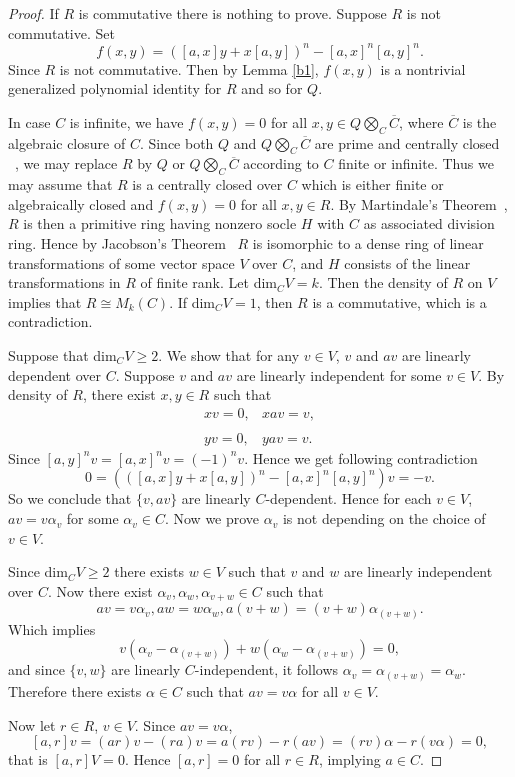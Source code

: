 \documentclass[12pt]{amsart}
\theoremstyle{definition}
\theoremstyle{remark}
\begin{document}
 \begin{proof}
 If $R$ is commutative there is nothing to prove.
 Suppose  $R$ is not commutative.
 Set
 $$f(x,y)=([a,x]y+x[a,y])^n-[a,x]^n[a,y]^n.$$
 Since $R$ is not commutative. Then by Lemma \ref{b1}, $f(x,y)$
 is a nontrivial generalized polynomial identity
 for $R$ and so for $Q$.

 \noindent
 In case $C$ is infinite, we have $f(x,y)=0$ for all
 $x, y\in Q\bigotimes_C \overline{C}$, where $\overline{C}$
 is the algebraic closure of $C$.
 Since both $Q$ and $Q\bigotimes_C\overline{C}$ are
 prime and centrally closed ~\cite{a5}, we may replace
 $R$ by $Q$ or $Q\bigotimes_C\overline{C}$ according to $C$ finite
 or infinite.
 Thus we may assume that $R$ is a centrally closed over $C$
 which is either finite or algebraically closed and $f(x,y)=0$
 for all $x, y\in R$.
 By Martindale's Theorem~\cite{a6}, $R$ is then a primitive
 ring having nonzero socle $H$ with $C$ as associated division ring.
 Hence by Jacobson's Theorem~\cite{a5} $R$ is isomorphic to
 a dense ring of linear transformations  of some vector space $V$
 over $C$, and $H$ consists of the linear transformations in $R$
 of finite rank.
 Let dim$_CV=k$. Then
 the density of $R$ on $V$  implies that $R\cong M_k(C)$.
 If  dim$_CV=1$, then $R$ is a commutative,
 which is a contradiction.

 \noindent
 Suppose that dim$_CV\geq 2$.
  We show that for any $v\in V$, $v$ and $av$ are linearly dependent
  over $C$. Suppose $v$ and $av$ are linearly independent for some
  $v\in V$.
  By density  of $R$, there exist $x, y \in R$ such that
  $$\begin{array}{cc}
    xv=0,  & xav=v, \\ \\
    yv=0,  & yav=v.
  \end{array}$$
  Since $[a,y]^nv=[a,x]^nv=(-1)^nv$.
  Hence we get following contradiction
  $$0=(([a,x]y+x[a,y])^n-[a,x]^n[a,y]^n)v=-v.$$
  So we conclude that
  $\{v, av\}$ are linearly
  $C$-dependent.
  Hence for each $v\in V$, $av=v\alpha_v$ for some
  $\alpha_v\in C$. Now we prove
  $\alpha_v$ is not depending on the choice of
  $v\in V$.

  \noindent
  Since dim$_CV\geq 2$ there exists
  $ w \in V$ such that $v$ and $w$ are  linearly
  independent over $C$. Now there exist
  $\alpha_v, \alpha_w, \alpha_{v+w}\in C$ such that
  $$av=v\alpha_v, aw=w\alpha_w, a(v+w)=(v+w)\alpha_{(v+w)}.$$
  Which implies
  $$v(\alpha_v-\alpha_{(v+w)})+w(\alpha_w-\alpha_{(v+w)})=0,$$
  and since $\{v, w \}$ are linearly $C$-independent,
  it follows $\alpha_v=\alpha_{(v+w)}=\alpha_w.$
  Therefore there exists $\alpha\in C$ such that
  $av=v\alpha$ for all $v\in V$.

 \noindent
 Now let $r\in R$, $v\in V$. Since $av=v\alpha$,
 $$[a,r]v=(ar)v-(ra)v=a(rv)-r(av)=(rv)\alpha-r(v\alpha)=0,$$
 that is $[a,r]V=0$.
 Hence $[a,r]=0$ for all $r\in R$, implying $a\in C$.
 \end{proof}
\end{document}
